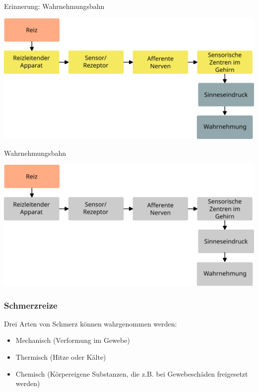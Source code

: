 \documentclass{beamer}
\begin{document}


\begin{frame}{Erinnerung: Wahrnehmungsbahn}
    
    \begin{center}
        \includegraphics[width=\textwidth]{wahrnehmungsprozess_ohne_beispiel.png}
    \end{center}
    
\end{frame}

\begin{frame}{Wahrnehmungsbahn}
    
    \begin{center}
        \includegraphics[width=\textwidth]{wahrnehmungsprozess_ohne_beispiel_reiz.png}
    \end{center}
    
\end{frame}





\begin{frame}
\frametitle{Schmerzreize}

Drei Arten von Schmerz können wahrgenommen werden:

\begin{itemize}
\item
Mechanisch (Verformung im Gewebe)
\item
Thermisch (Hitze oder Kälte)
\item
Chemisch (Körpereigene Substanzen, die z.B. bei Gewebeschäden freigesetzt werden)
\end{itemize}
\end{frame}
\end{document}
